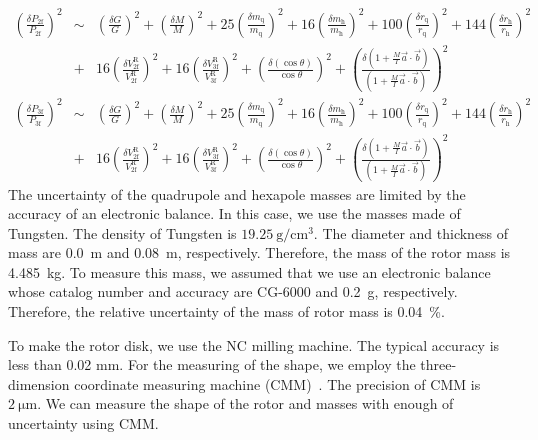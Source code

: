 \documentclass[A4]{spie}  %
\begin{document}
\begin{eqnarray}
\left( \frac{\delta P_{\mathrm{2f}}}{P_{\mathrm{2f}}} \right)^2 &\sim& \left( \frac{\delta G}{G} \right)^2 + \left( \frac{\delta M}{M} \right)^2+25\left( \frac{\delta m_{\mathrm{q}}}{m_{\mathrm{q}}} \right)^2+16\left( \frac{\delta m_{\mathrm{h}}}{m_{\mathrm{h}}} \right)^2 +100\left( \frac{\delta r_{\mathrm{q}}}{r_{\mathrm{q}}} \right)^2+144\left( \frac{\delta r_{\mathrm{h}}}{r_{\mathrm{h}}} \right)^2 \nonumber \\
&+&16\left( \frac{\delta V^{\mathrm{R}}_{{\mathrm{2f}}}}{V^{\mathrm{R}}_{{\mathrm{2f}}}} \right)^2+16\left( \frac{\delta V^{\mathrm{R}}_{{\mathrm{3f}}}}{V^{\mathrm{R}}_{{\mathrm{3f}}}} \right)^2+\left( \frac{\delta (\cos{\theta})}{\cos{\theta}} \right)^2+ \left( \frac{\delta\left( 1+\frac{M}{I}\vec{a}\cdot \vec{b} \right)}{\left( 1+\frac{M}{I}\vec{a}\cdot \vec{b} \right)} \right)^2 \\
\left( \frac{\delta P_{\mathrm{3f}}}{P_{\mathrm{3f}}} \right)^2 &\sim& \left( \frac{\delta G}{G} \right)^2 + \left( \frac{\delta M}{M} \right)^2+25\left( \frac{\delta m_{\mathrm{q}}}{m_{\mathrm{q}}} \right)^2+16\left( \frac{\delta m_{\mathrm{h}}}{m_{\mathrm{h}}} \right)^2 +100\left( \frac{\delta r_{\mathrm{q}}}{r_{\mathrm{q}}} \right)^2+144\left( \frac{\delta r_{\mathrm{h}}}{r_{\mathrm{h}}} \right)^2 \nonumber \\
&+&16\left( \frac{\delta V^{\mathrm{R}}_{{\mathrm{2f}}}}{V^{\mathrm{R}}_{{\mathrm{2f}}}} \right)^2+16\left( \frac{\delta V^{\mathrm{R}}_{{\mathrm{3f}}}}{V^{\mathrm{R}}_{{\mathrm{3f}}}} \right)^2+\left( \frac{\delta (\cos{\theta})}{\cos{\theta}} \right)^2+ \left( \frac{\delta\left( 1+\frac{M}{I}\vec{a}\cdot \vec{b} \right)}{\left( 1+\frac{M}{I}\vec{a}\cdot \vec{b} \right)} \right)^2 
\end{eqnarray}
The uncertainty of the quadrupole and hexapole masses are limited by the accuracy of  an electronic balance. In this case, we use the masses made of Tungsten. The density of Tungsten is $19.25~\mathrm{g/cm^3}$. The diameter and thickness of mass are 0.0~m and 0.08~m, respectively. Therefore, the mass of the rotor mass is 4.485~kg. To measure this mass, we assumed that we use an electronic balance whose catalog number and accuracy are CG-6000 and 0.2~g, respectively. Therefore, the relative uncertainty of the mass of rotor mass is 0.04~\%.

 To make the rotor disk, we use the NC milling machine. The typical accuracy is less than 0.02 mm. For the measuring of the shape, we employ the three-dimension coordinate measuring machine (CMM)~\cite{Inoue:2016kyq}. The precision of CMM is $2~\mathrm{\mu m}$. We can measure the shape of the rotor and masses with enough of uncertainty using CMM. 
\end{document}
